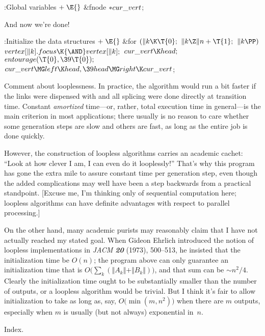 \B{}:Global variables\X${}\mathrel+\E{}$\6
\&{fnode} ${}{*}\\{cur\_vert}{}$;\par
\fi

And now we're done!

\Y\B\4:Initialize the data structures\X${}\mathrel+\E{}$\6
\&{for} ${}(\|k\K\T{0};{}$ ${}\|k\Z\|n+\T{1};{}$ ${}\|k\PP){}$\1\5
${}\\{vertex}[\|k].\\{focus}\K{\AND}\\{vertex}[\|k];{}$\2\6
${}\\{cur\_vert}\K\\{head};{}$\6
${}\\{entourage}(\T{0},\39\T{0});{}$\6
${}\\{cur\_vert}\MG\\{left}\K\\{head},\39\\{head}\MG\\{right}\K\\{cur%
\_vert}{}$;\par
\fi

Comment about looplessness. In practice, the algorithm
would run a bit faster if the  links were dispensed with
and all splicing were done directly at transition time. Constant
{\it amortized\/} time---or, rather, total execution time in general---is the
main criterion in most applications; there usually is no
reason to care whether some generation steps are slow and others are
fast, as long as the entire job is done quickly.

However, the construction of loopless algorithms carries an academic cachet:
``Look at how clever I am, I can even do it looplessly!''
That's why this program has gone the
extra mile to assure constant time per generation step, even though the
added complications
may well have been a step backwards from a practical standpoint.
[Excuse me, I'm thinking only of sequential computation here; loopless
algorithms can have definite advantages with respect to parallel processing.]

On the other hand, many academic purists may reasonably claim that I have not
actually reached my stated goal.
When Gideon Ehrlich introduced the notion of loopless implementations
in {\sl JACM\/ \bf20} (1973), 500--513, he insisted that the
initialization time be $O(n)$; the program above can only
guarantee an initialization time that is $O\bigl(\sum_k(\Vert A_k\Vert+
\Vert B_k\Vert)\bigr)$, and that sum can be $\sim n^2\!/4$.
Clearly the initialization time
ought to be substantially smaller than the number of outputs,
or a loopless algorithm would be trivial.
But I think it's fair to allow initialization to take as long
as, say, $O\bigl(\min(m,n^2)\bigr)$ when there are $m$ outputs,
especially when $m$ is usually (but not always) exponential in~$n$.

\fi

Index.
\fi

\inx
\fin
\con
